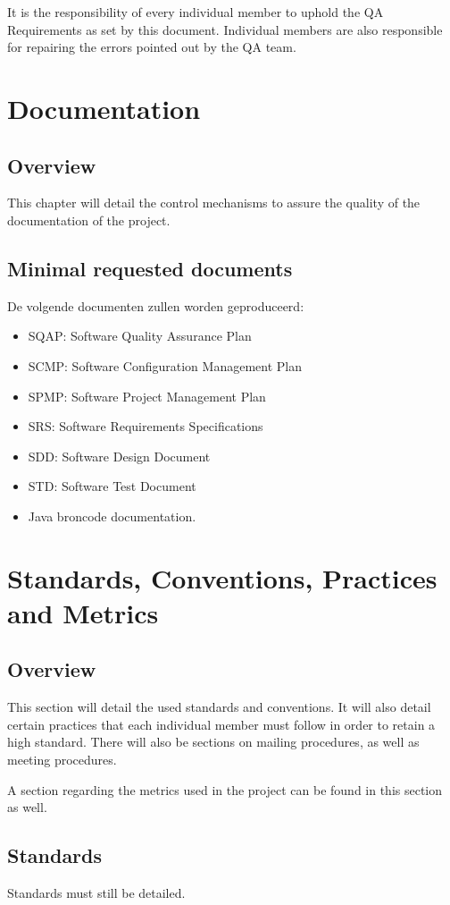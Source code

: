 \documentclass[salesmen, twoside]{../../../templates/latex/2009/softproj}
\begin{document}
\begin{projdoc}
It is the responsibility of every individual member to uphold the QA Requirements as set by this document. Individual members are also responsible for repairing the errors pointed out by the QA team.

\chapter{Documentation}
\section{Overview}
This chapter will detail the control mechanisms to assure the quality of the documentation of the project.
\section{Minimal requested documents}
De volgende documenten zullen worden geproduceerd:
\begin{itemize}
\item SQAP: Software Quality Assurance Plan
\item SCMP: Software Configuration Management Plan
\item SPMP: Software Project Management Plan
\item SRS: Software Requirements Specifications
\item SDD: Software Design Document
\item STD: Software Test Document
\item Java broncode documentation.
\end{itemize}

\chapter{Standards, Conventions, Practices and Metrics}
\section{Overview}
This section will detail the used standards and conventions. It will also detail certain practices that each individual member must follow in order to retain a high standard. There will also be sections on mailing procedures, as well as meeting procedures.

A section regarding the metrics used in the project can be found in this section as well.

\section{Standards}
Standards must still be detailed.

\end{projdoc}
\end{document}
